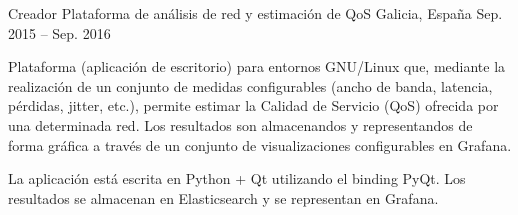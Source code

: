 \begin{cventries}
    \cventry
    {Creador}
    {Plataforma de análisis de red y estimación de QoS}
    {Galicia, España}
    {Sep. 2015 – Sep. 2016}
    {
      \begin{cvitems}
        \item {Plataforma (aplicación de escritorio) para entornos GNU/Linux que, mediante la realización de un conjunto de medidas configurables (ancho de banda, latencia, pérdidas, jitter, etc.), permite estimar la Calidad de Servicio (QoS) ofrecida por una determinada red. Los resultados son almacenandos y representandos de forma gráfica a través de un conjunto de visualizaciones configurables en Grafana.}
        \item {La aplicación está escrita en Python + Qt utilizando el binding PyQt. Los resultados se almacenan en Elasticsearch y se representan en Grafana.}
      \end{cvitems}
    }
\end{cventries}
